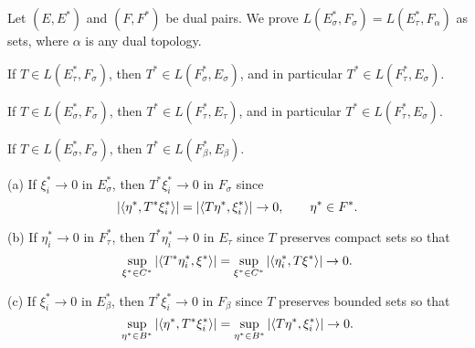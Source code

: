 \documentclass{../../large}
\begin{document}
\begin{prb}
Let $(E,E^*)$ and $(F,F^*)$ be dual pairs.
We prove $L(E^*_\sigma,F_\sigma)=L(E^*_\tau,F_\alpha)$ as sets, where $\alpha$ is any dual topology.
\begin{parts}
\item If $T\in L(E^*_\tau,F_\sigma)$, then $T^*\in L(F_\sigma^*,E_\sigma)$, and in particular $T^*\in L(F_\tau^*,E_\sigma)$.
\item If $T\in L(E^*_\sigma,F_\sigma)$, then $T^*\in L(F_\tau^*,E_\tau)$, and in particular $T^*\in L(F_\tau^*,E_\sigma)$.
\item If $T\in L(E^*_\sigma,F_\sigma)$, then $T^*\in L(F_\beta^*,E_\beta)$.
\end{parts}
\end{prb}
\begin{pf}
(a)
If $\xi^*_i\to0$ in $E^*_\sigma$, then $T^*\xi_i^*\to0$ in $F_\sigma$ since
\[|\langle\eta^*,T^*\xi_i^*\rangle|=|\langle T\eta^*,\xi_i^*\rangle|\to0,\qquad\eta^*\in F^*.\]

(b)
If $\eta^*_i\to0$ in $F^*_\tau$, then $T^*\eta^*_i\to0$ in $E_\tau$ since $T$ preserves compact sets so that
\[\sup_{\xi^*\in C^*}|\langle T^*\eta^*_i,\xi^*\rangle|=\sup_{\xi^*\in C^*}|\langle\eta^*_i,T\xi^*\rangle|\to0.\]

(c)
If $\xi^*_i\to0$ in $E^*_\beta$, then $T^*\xi^*_i\to0$ in $F_\beta$ since $T$ preserves bounded sets so that
\[\sup_{\eta^*\in B^*}|\langle\eta^*,T^*\xi^*_i\rangle|=\sup_{\eta^*\in B^*}|\langle T\eta^*,\xi^*_i\rangle|\to0.\]


\end{pf}


\begin{prb}

\end{prb}

\begin{prb}
\end{prb}
\end{document}
